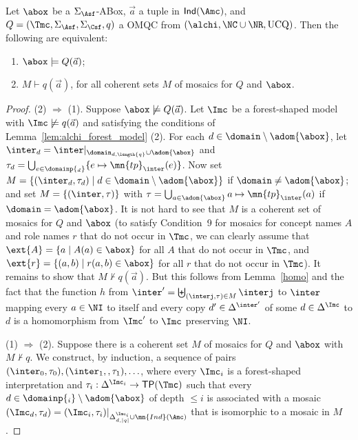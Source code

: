 \documentclass{lmcs}
\theoremstyle{definition}
\begin{document}
\begin{lem}\label{lem:alchi_mosaic}
  Let $\abox$ be a $\Sigma_{\Asf}$-ABox, $\vec{a}$ a tuple in ${\sf Ind}(\Amc)$, and
  $Q=(\Tmc,\Sigma_\Asf,\Sigma_\Csf,q)$ a OMQC from $(\alchi,\NC \cup
  \NR,\text{UCQ})$. Then the following are equivalent:
  \begin{enumerate}
  \item $\abox\models Q(\vec{a})$;
  \item $M \vdash q(\vec{a})$, for all coherent sets $M$ of mosaics for $Q$ and
    $\abox$.
  \end{enumerate}
\end{lem}
\begin{proof}
  (2) $\Rightarrow$ (1). Suppose
  $\abox\not\models Q(\vec{a})$. Let $\Imc$ be a forest-shaped model with $\Imc\not\models q(\vec{a})$
  and satisfying the conditions of Lemma~\ref{lem:alchi_forest_model} (2).
  For each $d\in\domain\setminus\adom{\abox}$, let
  $\inter_d=\inter|_{\domain_{d,\length{q}}\cup\adom{\abox}}$ and
  $\tau_d=\bigcup_{e\in\domainp{_d}}\{e\mapsto
  \mn{tp}_{\inter}(e)\}$. Now set $M=\{(\inter_d,\tau_d)\mid
  d\in\domain\setminus\adom{\abox}\}$ if $\domain\neq\adom{\abox}$;
  and set $M=\{(\inter,\tau)\}$ with
  $\tau=\bigcup_{a\in\adom{\abox}}a\mapsto \mn{tp}_\inter(a)$ if
  $\domain=\adom{\abox}$. It is not hard to see that $M$ is a coherent
  set of mosaics for $Q$ and $\abox$
  (to satisfy Condition~9 for mosaics for concept names $A$ and role names $r$ that do not occur in $\Tmc$,
  we can clearly assume that $\ext{A}=\{a\mid A(a)\in\abox\}$ for all $A$
  that do not occur in $\Tmc$, and $\ext{r}=\{(a,b)\mid
  r(a,b)\in\abox\}$ for all $r$ that do not occur in $\Tmc$).  It
  remains to show that $M\not\vdash q(\vec{a})$. 
  But this follows from Lemma~\ref{homo} and the fact that the function
  $h$ from $\inter'=\biguplus_{(\interj,\tau)\in M}\interj$ to $\inter$ mapping every $a\in \NI$ to itself
  and every copy $d'\in \Delta^{\inter'}$ of some $d\in \Delta^{\Imc}$ to $d$ is a homomorphism from $\Imc'$ to $\Imc$
  preserving $\NI$.

  (1) $\Rightarrow$ (2). Suppose there is a coherent set $M$ of mosaics
  for $Q$ and $\abox$ with $M\not\vdash q$. We construct, by
  induction, a sequence of pairs
  $(\inter_0,\tau_{0}),(\inter_1,,\tau_{1}),\ldots$, where every
  $\Imc_{i}$ is a forest-shaped interpretation and
  $\tau_{i}:\Delta^{\Imc_{i}}\rightarrow \mathsf{TP}(\Tmc)$ such that
  every $d\in\domainp{_i}\setminus\adom{\abox}$ of depth
  $\leq i$ is associated with a mosaic $(\Imc_{d},\tau_{d})=
  (\Imc_{i},\tau_{i})|_{\Delta^{\Imc_{i}}_{d,|q|}\cup \mn{Ind}(\Amc)}$
  that is isomorphic to a mosaic in $M$.


\end{proof}
\end{document}
